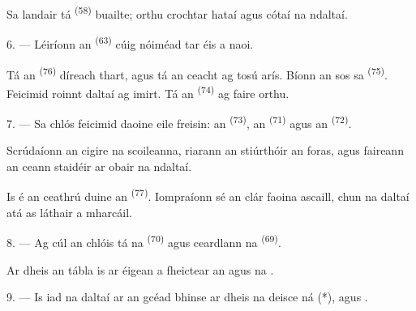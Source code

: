Sa landair tá  \textsuperscript{(58)} buailte; orthu crochtar
hataí agus cótaí na ndaltaí.

\VUsaut{5.2mm}
\VUsaut{3.6mm}

6. --- Léiríonn an  \textsuperscript{(63)} cúig nóiméad tar éis a naoi.

Tá an  \textsuperscript{(76)} díreach thart, agus tá an ceacht ag tosú
arís. Bíonn an sos sa  \textsuperscript{(75)}. Feicimid roinnt
daltaí ag imirt. Tá an  \textsuperscript{(74)} ag faire orthu.

7. --- Sa chlós feicimid daoine eile freisin: an 
\textsuperscript{(73)}, an  \textsuperscript{(71)} agus an
 \textsuperscript{(72)}.

Scrúdaíonn an cigire na scoileanna, riarann an stiúrthóir an foras, agus faireann
an ceann staidéir ar obair na ndaltaí.

Is é an ceathrú duine an  \textsuperscript{(77)}. Iompraíonn sé
an clár faoina ascaill, chun na daltaí atá as láthair a mharcáil.

8. --- Ag cúl an chlóis tá na 
\textsuperscript{(70)} agus ceardlann na 
\textsuperscript{(69)}.

Ar dheis an tábla is ar éigean a fheictear  an 
agus na .


\VUsaut{2.4mm}

\VUsaut{3.0mm}

9. --- Is iad na daltaí ar an gcéad bhinse ar dheis na deisce ná 
(*),  agus .

